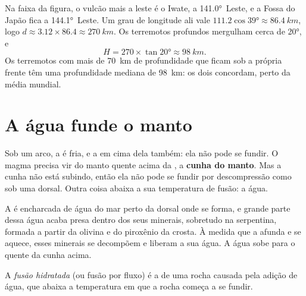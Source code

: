 \begin{example}\label{ex:g12:subduction-magmatism:japan}
Na faixa da figura, o vulcão mais a leste é o Iwate, a \ang{141.0}~Leste, e
a Fossa do Japão fica a \ang{144.1}~Leste. Um grau de longitude ali vale
$111.2\cos\ang{39} \approx \qty{86.4}{km}$, logo $d \approx 3.12 \times 86.4
\approx \qty{270}{km}$. Os terremotos profundos mergulham cerca de \ang{20},
e
\[
  H = 270 \times \tan\ang{20} \approx \qty{98}{km}.
\]
Os terremotos com mais de \qty{70}{km} de profundidade que ficam sob a
própria frente têm uma profundidade mediana de \qty{98}{km}: os dois
concordam, perto da média mundial.
\end{example}

\section{A água funde o manto}

Sob um arco, a  é fria, e a  em cima dela também: ela não
pode se fundir. O magma precisa vir do manto quente acima da , a
\textbf{cunha do manto}. Mas a cunha não está subindo, então ela não pode se
fundir por descompressão como sob uma dorsal. Outra coisa abaixa a sua
temperatura de fusão: a água.

A  é encharcada de água do mar perto da dorsal onde se forma,
e grande parte dessa água acaba presa dentro dos seus minerais, sobretudo na
serpentina, formada a partir da olivina e do piroxênio da crosta. À medida
que a  afunda e se aquece, esses minerais se decompõem e liberam a sua
água. A água sobe para o  quente da cunha acima.

\begin{definition}\label{def:g12:subduction-magmatism:hydrous-melting}
A \emph{fusão hidratada} (ou fusão por fluxo) é a
 de uma rocha causada pela adição de água, que abaixa a
temperatura em que a rocha começa a se fundir.
\end{definition}

